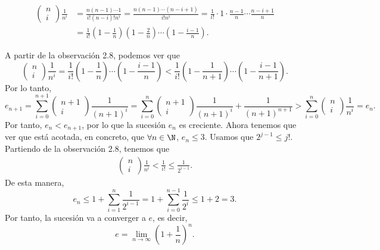 \begin{eg}
\begin{description}
\begin{observation}
\normalfont 
\[
\begin{split}
	\begin{pmatrix} n \\ i \end{pmatrix} \frac{1}{n^{i}} & = \frac{n\left(n-1\right) \cdots 1}{i ! \left(n-i\right)! n^{i}} 
							     = \frac{n\left(n-1\right) \cdots \left(n-i+1\right)}{i!n^{i}} 
							     = \frac{1}{i!} \cdot 1 \cdot \frac{n-1}{n} \cdots \frac{n-i+1}{n}\\
							     &= \frac{1}{i!} \left(1-\frac{1}{n}\right)\left(1 - \frac{2}{n}\right) \cdots \left(1-\frac{i-1}{n}\right) .
\end{split}
\]
\end{observation}
A partir de la observación 2.8, podemos ver que 
\[\begin{pmatrix} n \\ i \end{pmatrix} \frac{1}{n^{i}} = \frac{1}{i!} \left(1-\frac{1}{n}\right) \cdots \left(1 - \frac{i-1}{n}\right) < \frac{1}{i!}\left(1-\frac{1}{n+1}\right) \cdots \left(1 - \frac{i-1}{n+1}\right) .\]
Por lo tanto, 
\[e_{n+1} = \sum^{n+1}_{i = 0}\begin{pmatrix} n+1 \\ i \end{pmatrix} \frac{1}{\left(n+1\right)^{i}} = \sum^{n}_{i=0}\begin{pmatrix} n+1 \\ i \end{pmatrix}\frac{1}{\left(n+1\right)^{i}} + \frac{1}{\left(n+1\right)^{n+1}} > \sum^{n}_{i=0}\begin{pmatrix} n \\ i \end{pmatrix}\frac{1}{n^{i}} = e_{n}.\]
Por tanto, $\displaystyle e_{n} < e_{n+1} $, por lo que la sucesión $\displaystyle e_{n} $ es creciente. Ahora tenemos que ver que está acotada, en concreto, que $\displaystyle \forall n \in \N $, $\displaystyle e_{n} \leq 3 $. Usamos que $\displaystyle 2^{j-1} \leq j! $. Partiendo de la observación 2.8, tenemos que 
\[
\begin{split}
\begin{pmatrix} n \\ i \end{pmatrix} \frac{1}{n^{i}} < \frac{1}{i!} \leq \frac{1}{2^{i-1}} .
\end{split}
\]
De esta manera, 
\[e_{n} \leq 1 + \sum^{n}_{i = 1} \frac{1}{2^{i-1}} = 1 + \sum^{n-1}_{i = 0}\frac{1}{2^{i}}\leq 1 + 2 = 3 .\]
Por tanto, la sucesión va a converger a $\displaystyle e $, es decir, 
\[e = \lim_{n \to \infty}\left(1 + \frac{1}{n}\right)^{n} .\]
\end{description}
\end{eg}


